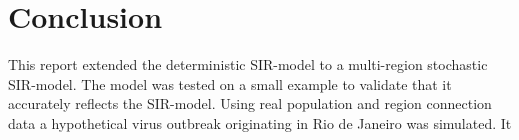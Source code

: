 \section{Conclusion}
This report extended the deterministic SIR-model to a multi-region stochastic SIR-model. The model was tested on a small example to validate that it accurately reflects the SIR-model. Using real population and region connection data a hypothetical virus outbreak originating in Rio de Janeiro was simulated. It